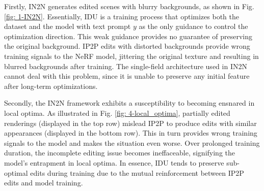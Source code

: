 

Firstly, IN2N generates edited scenes with blurry backgrounds, as shown in Fig. \ref{fig: 1-IN2N}. Essentially, IDU is a training process that optimizes both the dataset and the model with text prompt $y$ as the only guidance to control the optimization direction. This weak guidance provides no guarantee of preserving the original background. IP2P edits with distorted backgrounds provide wrong training signals to the NeRF model, jittering the original texture and resulting in blurred backgrounds after training. The single-field architecture used in IN2N cannot deal with this problem, since it is unable to preserve any initial feature after long-term optimizations.


Secondly, the IN2N framework exhibits a susceptibility to becoming ensnared in local optima. As illustrated in Fig. \ref{fig: 4-local_optima}, partially edited renderings (displayed in the top row) mislead IP2P to produce edits with similar appearances (displayed in the bottom row). This in turn provides wrong training signals to the model and makes the situation even worse. Over prolonged training duration, the incomplete editing issue becomes ineffaceable, signifying the model's entrapment in local optima. In essence, IDU tends to preserve sub-optimal edits during training due to the mutual reinforcement between IP2P edits and model training.

